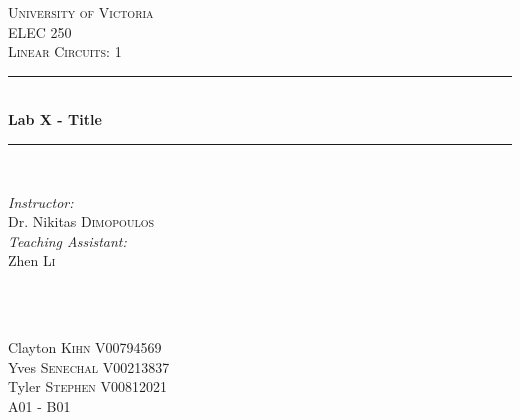 \documentclass[12pt]{article}
\newcommand{\HRule}{\rule{\linewidth}{0.5mm}}
\begin{document}

\begin{titlepage}

\center
 
\textsc{\LARGE University of Victoria}\\[1cm] 	%
\textsc{\Large ELEC 250}\\[0.5cm] 			%
\textsc{\large Linear Circuits: 1}\\[0.5cm] 		%


\HRule \\[0.4cm]
{ \huge \bfseries Lab X - Title}\\[0.2cm] %
\HRule \\[1.5cm]
 
 
\begin{minipage}{0.7\textwidth}
\begin{flushleft} 

\large\emph{Instructor:} \\
Dr. Nikitas \textsc{Dimopoulos} \\
\vspace{12 pt}
\emph{Teaching Assistant:} \\
Zhen \textsc{Li}

\end{flushleft}
\end{minipage}
~
\begin{minipage}{0.1\textwidth}
\begin{flushright} \large
\vspace{12 pt}
\end{flushright}
\end{minipage}\\[2cm]


\Large Clayton \textsc{Kihn}
\large V00794569	\\
\Large Yves \textsc{Senechal}
\large V00213837	\\
\Large Tyler \textsc{Stephen}
\large V00812021	\\
A01 - B01\\[1.5cm] 



\end{titlepage}
\end{document}
